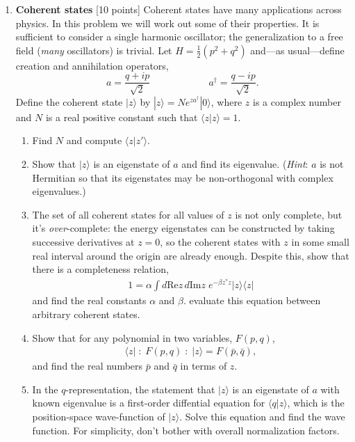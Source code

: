 \documentclass[12pt]{article}
\begin{document}
\begin{enumerate}
\item {\bf Coherent states} [10 points]
%
Coherent states have many applications across physics. In this problem we will work out some of their properties. It is sufficient to consider a single harmonic oscillator; the generalization to a free field (\textit{many} oscillators) is trivial. Let $H=\frac{1}{2}(p^2+q^2)$ and---as usual---define creation and annihilation operators,
$$
a=\frac{q+ip}{\sqrt{2}}
\qquad \qquad \qquad
a^\dag=\frac{q-ip}{\sqrt{2}}.
$$
Define the coherent state $|z\rangle$ by
$|z\rangle = Ne^{za^\dag}|0\rangle$,
where $z$ is a complex number and $N$ is a real positive constant such that $\langle z | z \rangle = 1$.
\begin{enumerate}
	\item Find $N$ and compute $\langle z|z'\rangle$.
	\item Show that $|z\rangle$ is an eigenstate of $a$ and find its eigenvalue. (\textit{Hint}: $a$ is not Hermitian so that its eigenstates may be non-orthogonal with complex eigenvalues.)
	\item The set of all coherent states for all values of $z$ is not only complete, but it's \textit{over}-complete: the energy eigenstates can be constructed by taking successive derivatives at $z=0$, so the coherent states with $z$ in some small real interval around the origin are already enough. Despite this, show that there is a completeness relation,
	\begin{align*}
		1 = \alpha \int d\text{Re}z\, d\text{Im}z\;  e^{-\beta z^* z}|z\rangle\langle z |
	\end{align*}
	and find the real constants $\alpha$ and $\beta$.  evaluate this equation between arbitrary coherent states.
	\item Show that for any polynomial in two variables, $F(p,q)$,
	\begin{align*}
		\langle z | \; : \; F(p,q)\; : \; | z\rangle = F(\bar p, \bar q),
	\end{align*}
	and find the real numbers $\bar p$ and $\bar q$ in terms of $z$.
	\item In the $q$-representation, the statement that $|z\rangle$ is an eigenstate of $a$ with known eigenvalue is a first-order diffential equation for $\langle q | z\rangle$, which is the position-space wave-function of $|z\rangle$. Solve this equation and find the wave function. For simplicity, don't bother with overall normalization factors.
\end{enumerate}


\end{enumerate}
\end{document}
